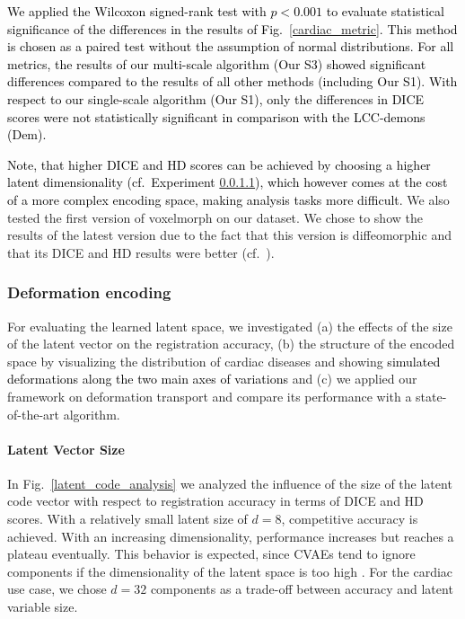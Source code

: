 \documentclass[journal]{IEEEtran}
\newcommand{\update}[1]{\textcolor{black}{#1}}
\begin{document}
\update{We applied the Wilcoxon signed-rank test with $p<0.001$ to evaluate statistical significance of the differences in the results of Fig.~\ref{cardiac_metric}. This method is chosen as a paired test without the assumption of normal distributions. For all metrics, the results of our multi-scale algorithm (Our S3) showed significant differences compared to the results of all other methods (including Our S1). With respect to our single-scale algorithm (Our S1), only the differences in DICE scores were not statistically significant in comparison with the LCC-demons (Dem).} 

\update{Note, that higher DICE and HD scores can be achieved by choosing a higher latent dimensionality (cf.\ Experiment \ref{lat_size}), which however comes at the cost of a more complex encoding space, making analysis tasks more difficult.} We also tested the first version of voxelmorph \cite{balakrishnan2018unsupervised} on our dataset. We chose to show the results of the latest version \cite{dalca2018unsupervised} due to the fact that this version is diffeomorphic and that its DICE and HD results were better (cf.\ \cite{krebs2018unsupervised}).

\subsubsection{Deformation encoding}
For evaluating the learned latent space, we investigated (a) the effects of the size of the latent vector on the registration accuracy, (b) the structure of the encoded space by visualizing the distribution of cardiac diseases and showing \update{simulated deformations along the two main axes of variations} and (c) we applied our framework on deformation transport and compare its performance with a state-of-the-art algorithm. 

\paragraph{Latent Vector Size}\label{lat_size} In Fig.~\ref{latent_code_analysis} we analyzed the influence of the size of the latent code vector with respect to registration accuracy in terms of DICE and HD scores. With a relatively small latent size of $d=8$, competitive accuracy is achieved. With an increasing dimensionality, performance increases but reaches a plateau eventually. This behavior is expected, since CVAEs tend to ignore components if the dimensionality of the latent space is too high \cite{kingma2014semi}. For the cardiac use case, we chose $d=32$ components as a trade-off between accuracy and latent variable size.
\end{document}
